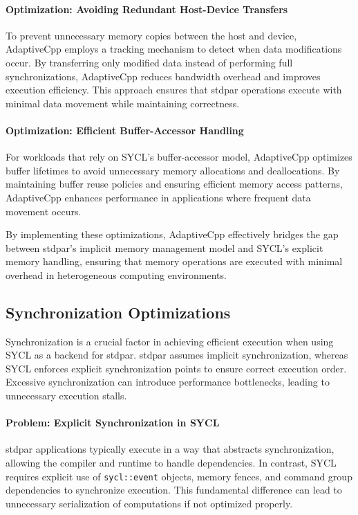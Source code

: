 \paragraph{Optimization: Avoiding Redundant Host-Device Transfers}
To prevent unnecessary memory copies between the host and device, AdaptiveCpp employs a tracking mechanism
to detect when data modifications occur. By transferring only modified data instead of performing full
synchronizations, AdaptiveCpp reduces bandwidth overhead and improves execution efficiency. This approach
ensures that stdpar operations execute with minimal data movement while maintaining correctness.

\paragraph{Optimization: Efficient Buffer-Accessor Handling}
For workloads that rely on SYCL's buffer-accessor model, AdaptiveCpp optimizes buffer lifetimes to avoid
unnecessary memory allocations and deallocations. By maintaining buffer reuse policies and ensuring efficient
memory access patterns, AdaptiveCpp enhances performance in applications where frequent data movement
occurs.

By implementing these optimizations, AdaptiveCpp effectively bridges the gap between stdpar’s implicit memory
management model and SYCL’s explicit memory handling, ensuring that memory operations are executed with
minimal overhead in heterogeneous computing environments.

\subsection{Synchronization Optimizations}
\label{sec:synchronization_optimizations}

Synchronization is a crucial factor in achieving efficient execution when using SYCL as a backend for stdpar.
stdpar assumes implicit synchronization, whereas SYCL enforces explicit synchronization points to ensure
correct execution order. Excessive synchronization can introduce performance bottlenecks, leading to unnecessary
execution stalls.

\paragraph{Problem: Explicit Synchronization in SYCL}
stdpar applications typically execute in a way that abstracts synchronization, allowing the compiler and runtime
to handle dependencies. In contrast, SYCL requires explicit use of \texttt{sycl::event} objects, memory fences,
and command group dependencies to synchronize execution. This fundamental difference can lead to unnecessary
serialization of computations if not optimized properly.

